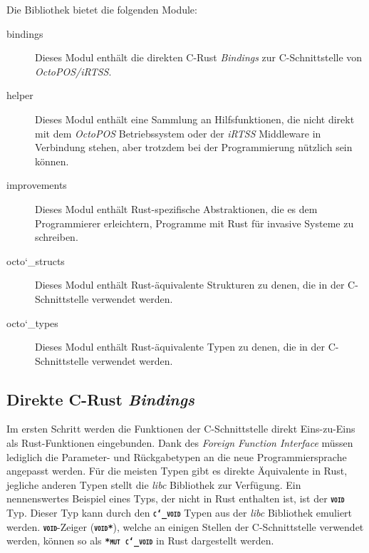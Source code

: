 Die Bibliothek bietet die folgenden Module:

\begin{description}

	\item[bindings] 
	Dieses Modul enthält die direkten C-Rust \textit{Bindings} zur C-Schnittstelle von \textit{OctoPOS/iRTSS}.
	
	\item[helper]
	Dieses Modul enthält eine Sammlung an Hilfsfunktionen, die nicht direkt mit dem \textit{OctoPOS} Betriebssystem 
	oder der \textit{iRTSS} Middleware in Verbindung stehen, aber trotzdem bei der Programmierung
	nützlich sein können.
	
	\item[improvements]
	Dieses Modul enthält Rust-spezifische Abstraktionen, die es dem Programmierer erleichtern,
	Programme mit Rust für invasive Systeme zu schreiben.
	
	\item[octo\char`_structs]
	Dieses Modul enthält Rust-äquivalente Strukturen zu denen, die in der C-Schnittstelle verwendet werden.
	
	\item[octo\char`_types]
	Dieses Modul enthält Rust-äquivalente Typen zu denen, die in der C-Schnittstelle verwendet werden.

\end{description}

\subsection{Direkte C-Rust \textit{Bindings}}

Im ersten Schritt werden die Funktionen der C-Schnittstelle direkt Eins-zu-Eins als Rust-Funktionen eingebunden.
Dank des \textit{Foreign Function Interface} müssen lediglich die Parameter- und Rückgabetypen
an die neue Programmiersprache angepasst werden.
Für die meisten Typen gibt es direkte Äquivalente in Rust, jegliche anderen Typen
stellt die \textit{libc} Bibliothek zur Verfügung. Ein nennenswertes Beispiel eines Typs, der nicht in Rust enthalten 
ist, ist der \texttt{\textsc{\textbf{void}}} Typ. Dieser Typ kann durch den
\texttt{\textsc{\textbf{c\char`_void}}} Typen aus der \textit{libc} Bibliothek emuliert werden.
\texttt{\textsc{\textbf{void}}}-Zeiger (\texttt{\textsc{\textbf{void*}}}), welche an einigen Stellen der
C-Schnittstelle verwendet werden, können so als \texttt{\textsc{\textbf{*mut c\char`_void}}} in Rust
dargestellt werden.

